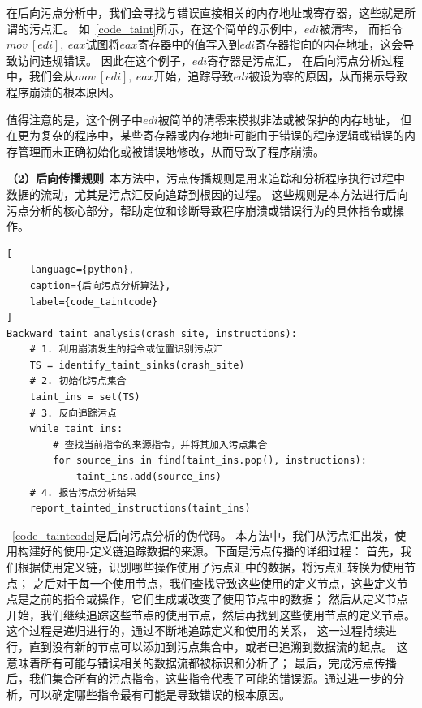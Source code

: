 在后向污点分析中，我们会寻找与错误直接相关的内存地址或寄存器，这些就是所谓的污点汇。
如~\autoref{code_taint}所示，在这个简单的示例中，$edi$被清零，
而指令$mov\ [edi],\ eax$试图将$eax$寄存器中的值写入到$edi$寄存器指向的内存地址，这会导致访问违规错误。
因此在这个例子，$edi$寄存器是污点汇，
在后向污点分析过程中，我们会从$mov\ [edi],\ eax$开始，追踪导致$edi$被设为零的原因，从而揭示导致程序崩溃的根本原因。

值得注意的是，这个例子中$edi$被简单的清零来模拟非法或被保护的内存地址，
但在更为复杂的程序中，某些寄存器或内存地址可能由于错误的程序逻辑或错误的内存管理而未正确初始化或被错误地修改，从而导致了程序崩溃。

\textbf{（2）后向传播规则}\ 
本方法中，污点传播规则是用来追踪和分析程序执行过程中数据的流动，尤其是污点汇反向追踪到根因的过程。
这些规则是本方法进行后向污点分析的核心部分，帮助定位和诊断导致程序崩溃或错误行为的具体指令或操作。




\begin{lstlisting}[
    language={python},
    caption={后向污点分析算法},
    label={code_taintcode}
]
Backward_taint_analysis(crash_site, instructions):
    # 1. 利用崩溃发生的指令或位置识别污点汇
    TS = identify_taint_sinks(crash_site)
    # 2. 初始化污点集合
    taint_ins = set(TS)
    # 3. 反向追踪污点
    while taint_ins:
        # 查找当前指令的来源指令，并将其加入污点集合
        for source_ins in find(taint_ins.pop(), instructions):
            taint_ins.add(source_ins)
    # 4. 报告污点分析结果
    report_tainted_instructions(taint_ins)
\end{lstlisting}

~\autoref{code_taintcode}是后向污点分析的伪代码。
本方法中，我们从污点汇出发，使用构建好的使用-定义链追踪数据的来源。下面是污点传播的详细过程：
首先，我们根据使用定义链，识别哪些操作使用了污点汇中的数据，将污点汇转换为使用节点；
之后对于每一个使用节点，我们查找导致这些使用的定义节点，这些定义节点是之前的指令或操作，它们生成或改变了使用节点中的数据；
然后从定义节点开始，我们继续追踪这些节点的使用节点，然后再找到这些使用节点的定义节点。
这个过程是递归进行的，通过不断地追踪定义和使用的关系，
这一过程持续进行，直到没有新的节点可以添加到污点集合中，或者已追溯到数据流的起点。
这意味着所有可能与错误相关的数据流都被标识和分析了；
最后，完成污点传播后，我们集合所有的污点指令，这些指令代表了可能的错误源。通过进一步的分析，可以确定哪些指令最有可能是导致错误的根本原因。

